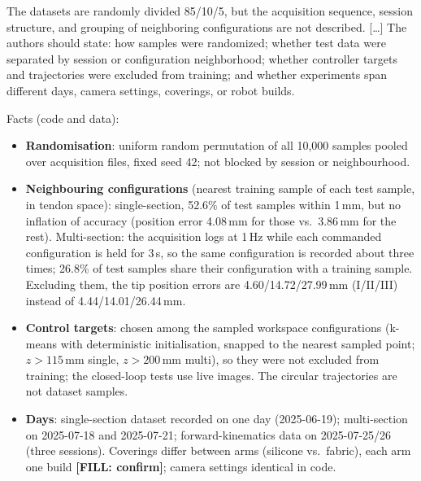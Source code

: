 \documentclass[10pt,a4paper]{article}
\newcommand{\FILL}[1]{\textcolor{orange!85!black}{\textbf{[FILL: #1]}}}
\begin{document}
\begin{rev}
The datasets are randomly divided 85/10/5, but the acquisition sequence, session structure, and grouping of neighboring configurations are not described. [\dots] The authors should state: how samples were randomized; whether test data were separated by session or configuration neighborhood; whether controller targets and trajectories were excluded from training; and whether experiments span different days, camera settings, coverings, or robot builds.
\end{rev}
\begin{todo}
Facts (code and data):
\begin{itemize}
\item \textbf{Randomisation}: uniform random permutation of all 10,000 samples pooled over acquisition files, fixed seed 42; not blocked by session or neighbourhood.
\item \textbf{Neighbouring configurations} (nearest training sample of each test sample, in tendon space): single-section, 52.6\% of test samples within 1\,mm, but no inflation of accuracy (position error 4.08\,mm for those vs.\ 3.86\,mm for the rest). Multi-section: the acquisition logs at 1\,Hz while each commanded configuration is held for 3\,s, so the same configuration is recorded about three times; 26.8\% of test samples share their configuration with a training sample. Excluding them, the tip position errors are 4.60/14.72/27.99\,mm (I/II/III) instead of 4.44/14.01/26.44\,mm.
\item \textbf{Control targets}: chosen among the sampled workspace configurations (k-means with deterministic initialisation, snapped to the nearest sampled point; $z>115$\,mm single, $z>200$\,mm multi), so they were not excluded from training; the closed-loop tests use live images. The circular trajectories are not dataset samples.
\item \textbf{Days}: single-section dataset recorded on one day (2025-06-19); multi-section on 2025-07-18 and 2025-07-21; forward-kinematics data on 2025-07-25/26 (three sessions). Coverings differ between arms (silicone vs.\ fabric), each arm one build \FILL{confirm}; camera settings identical in code.
\end{itemize}
\end{todo}
\end{document}
